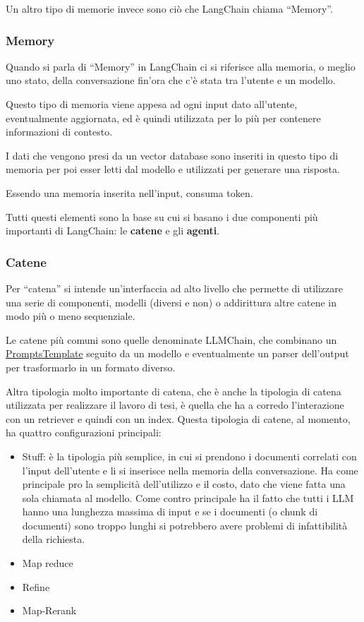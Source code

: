 Un altro tipo di memorie invece sono ciò che LangChain chiama ``Memory''.

\subsubsection{Memory}
Quando si parla di ``Memory'' in LangChain ci si riferisce alla memoria, o meglio uno stato, della conversazione fin'ora che c'è stata tra l'utente e un modello.

Questo tipo di memoria viene appesa ad ogni input dato all'utente, eventualmente aggiornata, ed è quindi utilizzata per lo più per contenere informazioni di contesto.

I dati che vengono presi da un vector database sono inseriti in questo tipo di memoria per poi esser letti dal modello e utilizzati per generare una risposta.

Essendo una memoria inserita nell'input, consuma token.

Tutti questi elementi sono la base su cui si basano i due componenti più importanti di LangChain: le \textbf{catene} e gli \textbf{agenti}.

\subsubsection*{Catene}

Per ``catena'' si intende un'interfaccia ad alto livello che permette di utilizzare una serie di componenti, modelli (diversi e non) o addirittura altre catene in modo più o meno sequenziale.

Le catene più comuni sono quelle denominate LLMChain, che combinano un \hyperref[PromptsTemplate]{PromptsTemplate} seguito da un modello e eventualmente un parser dell'output per trasformarlo in un formato diverso.

Altra tipologia molto importante di catena, che è anche la tipologia di catena utilizzata per realizzare il lavoro di tesi, è quella che ha a corredo l'interazione con un retriever e quindi con un index.
Questa tipologia di catene, al momento, ha quattro configurazioni principali:
\begin{itemize}
    \item Stuff: è la tipologia più semplice, in cui si prendono i documenti correlati con l'input dell'utente e li si inserisce nella memoria della conversazione. Ha come principale pro la semplicità dell'utilizzo e il costo, dato che viene fatta una sola chiamata al modello.
    Come contro principale ha il fatto che tutti i LLM hanno una lunghezza massima di input e se i documenti (o chunk di documenti) sono troppo lunghi si potrebbero avere problemi di infattibilità della richiesta. 
    \item Map reduce
    \item Refine
    \item Map-Rerank
\end{itemize}